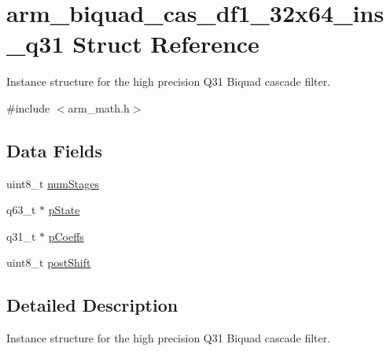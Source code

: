 \hypertarget{structarm__biquad__cas__df1__32x64__ins__q31}{\section{arm\-\_\-biquad\-\_\-cas\-\_\-df1\-\_\-32x64\-\_\-ins\-\_\-q31 Struct Reference}
\label{structarm__biquad__cas__df1__32x64__ins__q31}
}


Instance structure for the high precision Q31 Biquad cascade filter.  




{\ttfamily \#include $<$arm\-\_\-math.\-h$>$}

\subsection*{Data Fields}
\begin{DoxyCompactItemize}
\item 
uint8\-\_\-t \hyperlink{structarm__biquad__cas__df1__32x64__ins__q31_a3615af038f56917909e0370c11bc2ec7}{num\-Stages}
\item 
q63\-\_\-t $\ast$ \hyperlink{structarm__biquad__cas__df1__32x64__ins__q31_adefeb77301cc04e4d7d22f323029d588}{p\-State}
\item 
q31\-\_\-t $\ast$ \hyperlink{structarm__biquad__cas__df1__32x64__ins__q31_a68888e36167d81cb7836db10367a1682}{p\-Coeffs}
\item 
uint8\-\_\-t \hyperlink{structarm__biquad__cas__df1__32x64__ins__q31_a74050e9f36542bd56f4052381a82ae8f}{post\-Shift}
\end{DoxyCompactItemize}


\subsection{Detailed Description}
Instance structure for the high precision Q31 Biquad cascade filter. 

